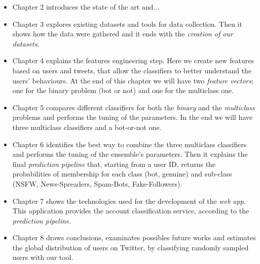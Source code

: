 \begin{itemize}
\item[\PencilRight] Chapter 2 introduces the state of the art and...

\item[\PencilRight] Chapter 3 explores existing datasets and tools for data collection. Then it shows how the data were gathered and it ends with the \emph{creation of our datasets}.

\item[\PencilRight] Chapter 4 explains the features engineering step. Here we create new features based on users and tweets, that allow the classifiers to better understand the users' behaviours. At the end of this chapter we will have two \emph{feature vectors}: one for the binary problem (bot or not) and one for the multiclass one.

\item[\PencilRight] Chapter 5 compares different classifiers for both the \emph{binary} and the \emph{multiclass} problems and performs the tuning of the parameters. In the end we will have three multiclass classifiers and a bot-or-not one.

\item[\PencilRight] Chapter 6 identifies the best way to combine the three multiclass classifiers and performs the tuning of the ensemble's parameters. Then it explains the final \emph{prediction pipeline} that, starting from a user ID, returns the probabilities of membership for each class (bot, genuine) and sub-class (NSFW, News-Spreaders, Spam-Bots, Fake-Followers).

\item[\PencilRight] Chapter 7 shows the technologies used for the development of the \emph{web app}. This application provides the account classification service, according to the \emph{prediction pipeline}.

\item[\PencilRight] Chapter 8 draws conclusions, examinates possibles future works and estimates the global distribution of users on Twitter, by classifying randomly sampled users with our tool.



\end{itemize}

